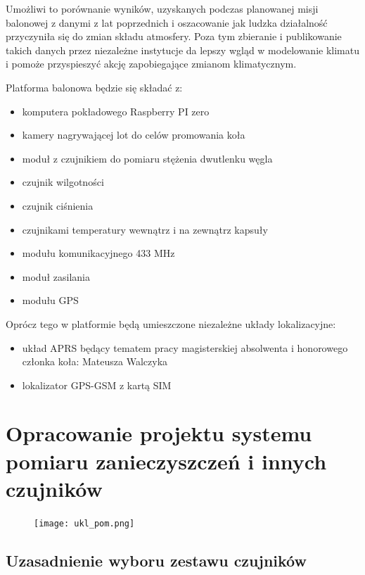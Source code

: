\documentclass[a4paper,12pt]{article}
\begin{document}
Umożliwi to porównanie wyników, uzyskanych podczas planowanej misji balonowej z danymi z lat poprzednich i oszacowanie jak ludzka działalność przyczyniła się do zmian składu atmosfery. Poza tym zbieranie i publikowanie takich danych przez niezależne instytucje da lepszy wgląd w modelowanie klimatu i pomoże przyspieszyć akcję zapobiegające zmianom klimatycznym.

Platforma balonowa będzie się składać z:
\begin{itemize}
 \item komputera pokładowego Raspberry PI zero
 \item kamery nagrywającej lot do celów promowania koła
 \item moduł z czujnikiem do pomiaru stężenia dwutlenku węgla
 \item czujnik wilgotności
 \item czujnik ciśnienia
 \item czujnikami temperatury wewnątrz i na zewnątrz kapsuły
 \item modułu komunikacyjnego 433 MHz
 \item moduł zasilania
 \item modułu GPS
\end{itemize}

Oprócz tego w platformie będą umieszczone niezależne układy lokalizacyjne:
\begin{itemize}
 \item układ APRS będący tematem pracy magisterskiej absolwenta i honorowego członka koła: Mateusza Walczyka
 \item lokalizator GPS-GSM z kartą SIM
\end{itemize}

 
\section{Opracowanie projektu systemu pomiaru zanieczyszczeń i innych czujników}

\begin{figure}[htpb]
\centering
\texttt{[image: ukl\_pom.png]}
 \label{schem}
\end{figure}


\subsection{Uzasadnienie wyboru zestawu czujników}
\end{document}
